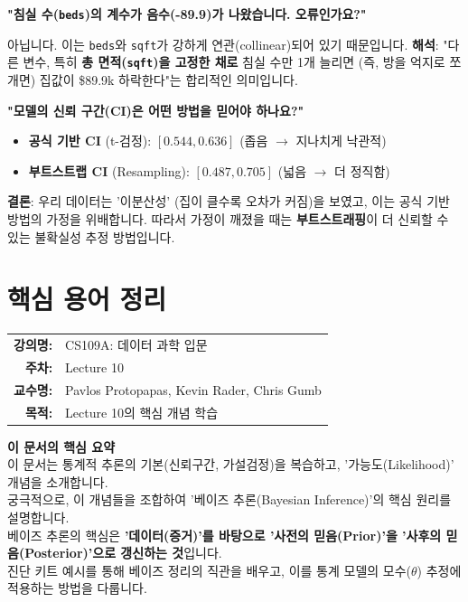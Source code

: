 \documentclass[11pt,a4paper]{book}
\makeatletter
\theoremstyle{definition}
\newcommand{\metainfo}[4]{
\begin{tcolorbox}[
    colback=lightpurple,
    colframe=darkpurple,
    boxrule=1pt,
    arc=2mm,
    left=10pt,
    right=10pt,
    top=8pt,
    bottom=8pt
]
\begin{tabular}{@{}rl@{}}
\textbf{강의명:} & #1 \\[0.3em]
\textbf{주차:} & #2 \\[0.3em]
\textbf{교수명:} & #3 \\[0.3em]
\textbf{목적:} & \begin{minipage}[t]{0.75\textwidth}#4\end{minipage}
\end{tabular}
\end{tcolorbox}
}
\makeatother
\begin{document}
\begin{tcolorbox}[colback=gray!10!white, colframe=black, title={4. 다중공선성 (Collinearity) 함정}]
\textbf{"침실 수(\texttt{beds})의 계수가 음수(-89.9)가 나왔습니다. 오류인가요?"}

아닙니다. 이는 \texttt{beds}와 \texttt{sqft}가 강하게 연관(collinear)되어 있기 때문입니다.
\textbf{해석}: "다른 변수, 특히 \textbf{총 면적(\texttt{sqft})을 고정한 채로} 침실 수만 1개 늘리면 (즉, 방을 억지로 쪼개면) 집값이 \$89.9k 하락한다"는 합리적인 의미입니다.
\end{tcolorbox}

\begin{tcolorbox}[colback=red!5!white, colframe=red!75!black, title={5. 이분산성 (Heteroscedasticity)과 추론}]
\textbf{"모델의 신뢰 구간(CI)은 어떤 방법을 믿어야 하나요?"}

\begin{itemize}
    \item \textbf{공식 기반 CI} (t-검정): $[0.544, 0.636]$ (좁음 $\to$ 지나치게 낙관적)
    \item \textbf{부트스트랩 CI} (Resampling): $[0.487, 0.705]$ (넓음 $\to$ 더 정직함)
\end{itemize}

\textbf{결론}: 우리 데이터는 '이분산성' (집이 클수록 오차가 커짐)을 보였고, 이는 공식 기반 방법의 가정을 위배합니다.
따라서 가정이 깨졌을 때는 \textbf{부트스트래핑}이 더 신뢰할 수 있는 불확실성 추정 방법입니다.
\end{tcolorbox}


\chapter{핵심 용어 정리}
\label{ch:lecture10}

\metainfo{CS109A: 데이터 과학 입문}{Lecture 10}{Pavlos Protopapas, Kevin Rader, Chris Gumb}{Lecture 10의 핵심 개념 학습}


\begin{summarybox}
    \textbf{이 문서의 핵심 요약} \\
    이 문서는 통계적 추론의 기본(신뢰구간, 가설검정)을 복습하고, '가능도(Likelihood)' 개념을 소개합니다. \\
    궁극적으로, 이 개념들을 조합하여 '베이즈 추론(Bayesian Inference)'의 핵심 원리를 설명합니다. \\
    베이즈 추론의 핵심은 \textbf{'데이터(증거)'를 바탕으로 '사전의 믿음(Prior)'을 '사후의 믿음(Posterior)'으로 갱신하는 것}입니다. \\
    진단 키트 예시를 통해 베이즈 정리의 직관을 배우고, 이를 통계 모델의 모수($\theta$) 추정에 적용하는 방법을 다룹니다.
\end{summarybox}
\end{document}
